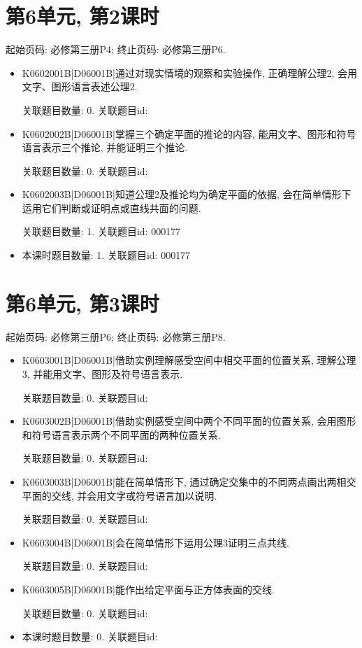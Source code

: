 \section*{第6单元, 第2课时}
起始页码: 必修第三册P4; 终止页码: 必修第三册P6.
\begin{itemize}
\item K0602001B|D06001B|通过对现实情境的观察和实验操作, 正确理解公理2, 会用文字、图形语言表述公理2.

关联题目数量: 0. 关联题目id: 

\item K0602002B|D06001B|掌握三个确定平面的推论的内容, 能用文字、图形和符号语言表示三个推论, 并能证明三个推论.

关联题目数量: 0. 关联题目id: 

\item K0602003B|D06001B|知道公理2及推论均为确定平面的依据, 会在简单情形下运用它们判断或证明点或直线共面的问题.

关联题目数量: 1. 关联题目id: 000177

\item 本课时题目数量: 1. 关联题目id: 000177

\end{itemize}

\section*{第6单元, 第3课时}
起始页码: 必修第三册P6; 终止页码: 必修第三册P8.
\begin{itemize}
\item K0603001B|D06001B|借助实例理解感受空间中相交平面的位置关系, 理解公理3, 并能用文字、图形及符号语言表示.

关联题目数量: 0. 关联题目id: 

\item K0603002B|D06001B|借助实例感受空间中两个不同平面的位置关系, 会用图形和符号语言表示两个不同平面的两种位置关系.

关联题目数量: 0. 关联题目id: 

\item K0603003B|D06001B|能在简单情形下, 通过确定交集中的不同两点画出两相交平面的交线, 并会用文字或符号语言加以说明.

关联题目数量: 0. 关联题目id: 

\item K0603004B|D06001B|会在简单情形下运用公理3证明三点共线.

关联题目数量: 0. 关联题目id: 

\item K0603005B|D06001B|能作出给定平面与正方体表面的交线.

关联题目数量: 0. 关联题目id: 

\item 本课时题目数量: 0. 关联题目id: 

\end{itemize}

